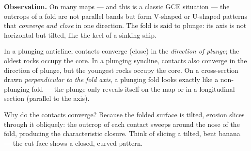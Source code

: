 \documentclass[11pt]{article}
\newcommand{\cle}[1]{{\popxbold\color{popdark}#1}}
\newcounter{popsec}
\newcounter{popsub}
\newcommand{\courssub}[1]{%
  \stepcounter{popsub}%
  \par\vspace{9pt}\noindent{\popxbold\fontsize{11.5}{13}\selectfont\color{popink}{\color{poporange}\thepopsec.\thepopsub}\hspace{6pt}#1}\par\nopagebreak\vspace{4pt}
}
\begin{document}
\courssub{Plunging Folds}

\textbf{Observation.} On many maps — and this is a classic GCE situation — the outcrops of a fold are not parallel bands but form V-shaped or U-shaped patterns that \emph{converge and close} in one direction. The fold is said to \cle{plunge}: its axis is not horizontal but tilted, like the keel of a sinking ship.

\begin{propriete}
In a plunging anticline, contacts converge (close) in the \emph{direction of plunge}; the oldest rocks occupy the core. In a plunging syncline, contacts also converge in the direction of plunge, but the youngest rocks occupy the core. On a cross-section drawn \emph{perpendicular to the fold axis}, a plunging fold looks exactly like a non-plunging fold — the plunge only reveals itself on the map or in a longitudinal section (parallel to the axis).
\end{propriete}

Why do the contacts converge? Because the folded surface is tilted, erosion slices through it obliquely: the outcrop of each contact sweeps around the nose of the fold, producing the characteristic closure. Think of slicing a tilted, bent banana — the cut face shows a closed, curved pattern.
\end{document}
